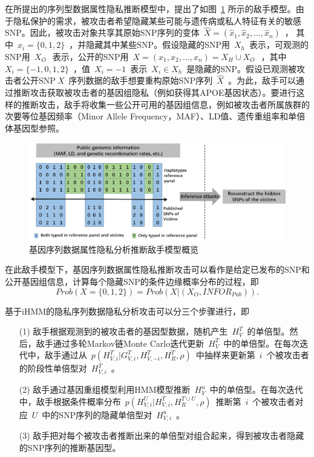 \documentclass[pdftex,notypeinfo,twoside,openany,UTF8,fntef]{CASthesis}
\theoremstyle{THrm}{
	\newtheorem{question}{Question}[section]
	\newtheorem{property}{性质}[section]
	\newtheorem{assumption}{假设}[section]
	\newtheorem{claim}[lemma]{断言}
	
}
\begin{document}
在所提出的序列型数据属性隐私推断模型中，提出了如图~\ref{fig:adversary-model} 所示的敌手模型。由于隐私保护的需求，被攻击者希望隐藏某些可能与遗传病或私人特征有关的敏感SNP。因此，被攻击对象共享其原始SNP序列的变体~$\hat{X}=(\hat{x}_1,\hat{x}_2, ... , \hat{x}_n)$~， 其中~$\hat{x}_i =\{0,1,2\}$~，并隐藏其中某些SNP。假设隐藏的SNP用~$X_h$~表示，可观测的SNP用~$X_O~$~表示，公开的SNP用~$X=(x_1, x_2, ..., x_n)=X_H \cup X_O~$~，其中~$X_i =\{-1,0,1,2\}$~，值~$X_i=-1$~表示~$X_i\in X_h$~是隐藏的SNP。假设已观测被攻击者公开SNP$~X$~序列数据的敌手想要重构原始SNP序列~$\hat{X}$~。为此，敌手可以通过推断攻击获取被攻击者的基因组隐私（例如获得其APOE基因状态）。要进行这样的推断攻击，敌手将收集一些公开可用的基因组信息，例如被攻击者所属族群的次要等位基因频率（Minor Allele Frequency，MAF）、LD值、遗传重组率和单倍体基因型参照。

\begin{figure}[htbp]
	\centering
	\includegraphics[width = 0.95\linewidth]{./figures/Fig2-adversary-model}
	\caption{基因序列数据属性隐私分析推断敌手模型概览}
	\label{fig:adversary-model}
\end{figure}

在此敌手模型下，基因序列数据属性隐私推断攻击可以看作是给定已发布的SNP和公开基因组信息，计算每个隐藏SNP的条件边缘概率分布的过程，即
\begin{equation}
Prob(X=\{0,1,2\})=Prob(X|(X_O,{INFOR}_{Pub})).
\end{equation}

基于iHMM的隐私序列数据隐私分析攻击可以分三个步骤进行，即

\begin{enumerate}
	\item[(1)] 敌手根据观测到的被攻击者的基因型数据，随机产生~$H_V^T$~的单倍型。然后，敌手通过多轮Markov链Monte Carlo迭代更新~$H_V^T$~中的单倍型。在每次迭代中，敌手通过从~$p(H_{V,i}^T|G_{V,i}^T,H_{V,-i}^T,H_R^T,\rho)$~中抽样来更新第~$i$~个被攻击者的阶段性单倍型对~$H_{V,i}^T$~。
	\item[(2)] 敌手通过基因重组模型利用HMM模型推断~$H_V^u$~中的单倍型。在每次迭代中，敌手根据条件概率分布~$p(H_{V,i}^U|H_{V,i}^T, H_R^{T \cup U},\rho)$~推断第~$i$~个被攻击者对应~$U$~中的SNP序列的隐藏单倍型对~$H_{V,i}^u$~。 
	\item[(3)] 敌手把对每个被攻击者推断出来的单倍型对组合起来，得到被攻击者隐藏的SNP序列的推断基因型。
\end{enumerate}
\end{document}
